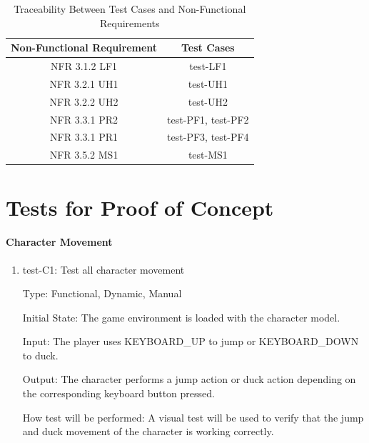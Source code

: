 \documentclass[12pt, titlepage]{article}
\begin{document}
\begin{table}[H]
  \begin{center}
    \caption{Traceability Between Test Cases and Non-Functional Requirements}
    \label{tab:table1}
    \begin{tabular}{c|c} 
        \toprule
        \textbf{Non-Functional Requirement} & \textbf{Test Cases}\\
        \midrule
        NFR 3.1.2 LF1 & test-LF1 \\
        \hline
        NFR 3.2.1 UH1 & test-UH1\\
        \hline
        NFR 3.2.2 UH2 & test-UH2\\
        \hline
        NFR 3.3.1 PR2 & test-PF1, test-PF2\\
        \hline
        NFR 3.3.1 PR1 & test-PF3, test-PF4\\
        \hline
        NFR 3.5.2 MS1 & test-MS1\\
        \bottomrule
    \end{tabular}
  \end{center}
\end{table}



\section{Tests for Proof of Concept}
		
\paragraph{Character Movement}

\begin{enumerate}

\item{test-C1: Test all character movement\\}

Type: Functional, Dynamic, Manual
					
Initial State: The game environment is loaded with the character model.
					
Input: The player uses KEYBOARD\_UP to jump or KEYBOARD\_DOWN to duck.
					
Output: The character performs a jump action or duck action depending on the corresponding keyboard button pressed.
					
How test will be performed: A visual test will be used to verify that the jump and duck movement of the character is working correctly.
\end{enumerate}
\end{document}
